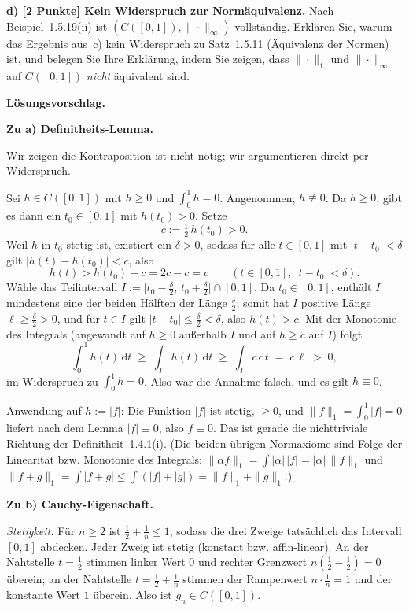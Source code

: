 \documentclass[a4paper,11pt]{article}
\begin{document}
\textbf{d) [2 Punkte] Kein Widerspruch zur Normäquivalenz.}\;
Nach Beispiel~1.5.19(ii) ist $(C([0,1]),\|\cdot\|_\infty)$ vollständig. Erklären Sie, warum das Ergebnis aus~c) kein Widerspruch zu Satz~1.5.11 (Äquivalenz der Normen) ist, und belegen Sie Ihre Erklärung, indem Sie zeigen, dass $\|\cdot\|_1$ und $\|\cdot\|_\infty$ auf $C([0,1])$ \emph{nicht} äquivalent sind.\par\smallskip
\textbf{L\"osungsvorschlag.}\par
\textbf{Zu a) Definitheits-Lemma.}

Wir zeigen die Kontraposition ist nicht nötig; wir argumentieren direkt per Widerspruch.

Sei $h\in C([0,1])$ mit $h\ge 0$ und $\int_0^1 h=0$. Angenommen, $h\not\equiv 0$. Da $h\ge 0$, gibt es dann ein $t_0\in[0,1]$ mit $h(t_0)>0$. Setze
\[
c:=\tfrac12\,h(t_0)>0.
\]
Weil $h$ in $t_0$ stetig ist, existiert ein $\delta>0$, sodass für alle $t\in[0,1]$ mit $|t-t_0|<\delta$ gilt $|h(t)-h(t_0)|<c$, also
\[
h(t) > h(t_0)-c = 2c-c = c \qquad (t\in[0,1],\ |t-t_0|<\delta).
\]
Wähle das Teilintervall $I:=\bigl[t_0-\tfrac\delta2,\,t_0+\tfrac\delta2\bigr]\cap[0,1]$. Da $t_0\in[0,1]$, enthält $I$ mindestens eine der beiden Hälften der Länge $\tfrac\delta2$; somit hat $I$ positive Länge $\ell\ge\tfrac\delta2>0$, und für $t\in I$ gilt $|t-t_0|\le\tfrac\delta2<\delta$, also $h(t)>c$. Mit der Monotonie des Integrals (angewandt auf $h\ge 0$ außerhalb $I$ und auf $h\ge c$ auf $I$) folgt
\[
\int_0^1 h(t)\,\mathrm{d}t \;\ge\; \int_I h(t)\,\mathrm{d}t \;\ge\; \int_I c\,\mathrm{d}t \;=\; c\,\ell \;>\; 0,
\]
im Widerspruch zu $\int_0^1 h=0$. Also war die Annahme falsch, und es gilt $h\equiv 0$.

Anwendung auf $h:=|f|$: Die Funktion $|f|$ ist stetig, $\ge 0$, und $\|f\|_1=\int_0^1|f|=0$ liefert nach dem Lemma $|f|\equiv 0$, also $f\equiv 0$. Das ist gerade die nichttriviale Richtung der Definitheit~1.4.1(i). (Die beiden übrigen Normaxiome sind Folge der Linearität bzw. Monotonie des Integrals: $\|\alpha f\|_1=\int|\alpha|\,|f|=|\alpha|\,\|f\|_1$ und $\|f+g\|_1=\int|f+g|\le\int(|f|+|g|)=\|f\|_1+\|g\|_1$.)

\medskip
\textbf{Zu b) Cauchy-Eigenschaft.}

\emph{Stetigkeit.} Für $n\ge 2$ ist $\tfrac12+\tfrac1n\le 1$, sodass die drei Zweige tatsächlich das Intervall $[0,1]$ abdecken. Jeder Zweig ist stetig (konstant bzw. affin-linear). An der Nahtstelle $t=\tfrac12$ stimmen linker Wert $0$ und rechter Grenzwert $n(\tfrac12-\tfrac12)=0$ überein; an der Nahtstelle $t=\tfrac12+\tfrac1n$ stimmen der Rampenwert $n\cdot\tfrac1n=1$ und der konstante Wert $1$ überein. Also ist $g_n\in C([0,1])$.
\end{document}
